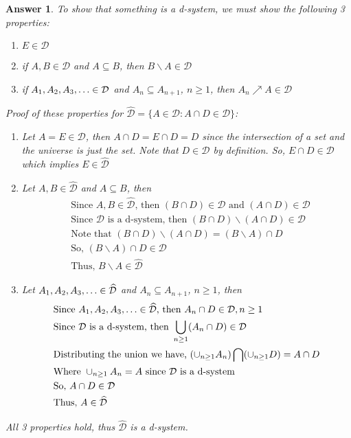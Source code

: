 \documentclass[12pt]{article}
\theoremstyle{colon}
\newtheorem*{answer}{Answer}
\begin{document}
\begin{answer}
  To show that something is a d-system, we must show the following 3 properties:

  \begin{enumerate}[label=\roman*)]
    \item $E \in \mathcal{D}$
    \item if $A, B \in \mathcal{D}$ and $A \subseteq B$, then $ B \backslash A \in \mathcal{D}$
    \item if $A_1, A_2, A_3, \mathellipsis \in \mathcal{D}$ and $A_n \subseteq A_{n+1}$, $n \geq 1$, then $A_n \nearrow A \in \mathcal{D}$
  \end{enumerate}

  Proof of these properties for $\widehat{\mathcal{D}} = \{A \in \mathcal{D}: A \cap D \in \mathcal{D}\}$:

  \begin{enumerate}[label=\roman*)]
    \item Let $A = E \in \mathcal{D}$, then $A \cap D = E \cap D = D$ since the intersection of a set and the universe is just the set. Note that $D \in \mathcal{D}$ by definition. So, $E \cap D \in \mathcal{D}$ which implies $E \in \widehat{\mathcal{D}}$
    \item Let $A, B \in \widehat{\mathcal{D}}$ and $A \subseteq B$, then
      \begin{align*}
        & \text{Since $A, B \in \widehat{\mathcal{D}}$, then } (B \cap D) \in \mathcal{D} \text{ and } (A \cap D) \in \mathcal{D} \\
        & \text{Since  $\mathcal{D}$ is a d-system, then } (B \cap D) \backslash (A \cap D) \in \mathcal{D} \\
        & \text{Note that } (B \cap D) \backslash (A \cap D) =(B \backslash A) \cap D \\
        & \text{So, } (B \backslash A) \cap D \in \mathcal{D} \\
        & \text{Thus, } B \backslash A \in \widehat{\mathcal{D}}
      \end{align*}
    \item Let $A_1, A_2, A_3, \mathellipsis \in \widehat{\mathcal{D}}$ and $A_n \subseteq A_{n+1}$, $n \geq 1$, then
      \begin{align*}
        & \text{Since $A_1, A_2, A_3, \mathellipsis \in \widehat{\mathcal{D}}$, then } A_n \cap D \in \mathcal{D}, n \geq 1 \\
        & \text{Since  $\mathcal{D}$ is a d-system, then } \bigcup\limits_{n \geq 1}(A_n \cap D) \in \mathcal{D} \\
        & \text{Distributing the union we have, } (\cup_{n \geq 1}A_n) \bigcap (\cup_{n \geq 1}D) = A \cap D \\
        & \text{Where } \cup_{n \geq 1}A_n = A \text{ since $\mathcal{D}$ is a d-system} \\
        & \text{So, } A \cap D \in \mathcal{D} \\
        & \text{Thus, } A \in \widehat{\mathcal{D}}
      \end{align*}
  \end{enumerate}

  All 3 properties hold, thus $\widehat{\mathcal{D}}$ is a d-system.
\end{answer}
\end{document}

